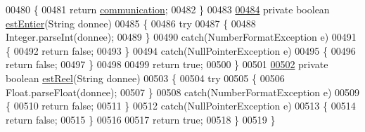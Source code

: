 \begin{DoxyCode}
00480     \{
00481         \textcolor{keywordflow}{return} \hyperlink{classcom_1_1lasalle_1_1meeting_1_1_main_activity_a6a358d10ba0f56af3b548e41902db273}{communication};
00482     \}
00483 
\hyperlink{classcom_1_1lasalle_1_1meeting_1_1_main_activity_a3841414e5b270c189de0d58bbd2aca57}{00484}     \textcolor{keyword}{private} \textcolor{keywordtype}{boolean} \hyperlink{classcom_1_1lasalle_1_1meeting_1_1_main_activity_a3841414e5b270c189de0d58bbd2aca57}{estEntier}(String donnee)
00485     \{
00486         \textcolor{keywordflow}{try}
00487         \{
00488             Integer.parseInt(donnee);
00489         \}
00490         \textcolor{keywordflow}{catch}(NumberFormatException e)
00491         \{
00492             \textcolor{keywordflow}{return} \textcolor{keyword}{false};
00493         \}
00494         \textcolor{keywordflow}{catch}(NullPointerException e)
00495         \{
00496             \textcolor{keywordflow}{return} \textcolor{keyword}{false};
00497         \}
00498 
00499         \textcolor{keywordflow}{return} \textcolor{keyword}{true};
00500     \}
00501 
\hyperlink{classcom_1_1lasalle_1_1meeting_1_1_main_activity_a8d0cd387540353465b1982157b20631c}{00502}     \textcolor{keyword}{private} \textcolor{keywordtype}{boolean} \hyperlink{classcom_1_1lasalle_1_1meeting_1_1_main_activity_a8d0cd387540353465b1982157b20631c}{estReel}(String donnee)
00503     \{
00504         \textcolor{keywordflow}{try}
00505         \{
00506             Float.parseFloat(donnee);
00507         \}
00508         \textcolor{keywordflow}{catch}(NumberFormatException e)
00509         \{
00510             \textcolor{keywordflow}{return} \textcolor{keyword}{false};
00511         \}
00512         \textcolor{keywordflow}{catch}(NullPointerException e)
00513         \{
00514             \textcolor{keywordflow}{return} \textcolor{keyword}{false};
00515         \}
00516 
00517         \textcolor{keywordflow}{return} \textcolor{keyword}{true};
00518     \}
00519 \}
\end{DoxyCode}
